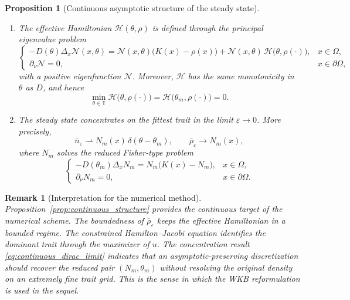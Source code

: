 \documentclass[11pt, dina4, amsfont12]{article}
\newtheorem{proposition}{Proposition}[section]
\newtheorem{remark}{Remark}[section]
\begin{document}
\begin{proposition}[Continuous asymptotic structure of the steady state]
\begin{enumerate}
\item The effective Hamiltonian \(\mathcal H(\theta,\rho)\) is defined through the principal eigenvalue problem
\begin{equation}\label{eq:eigen_N}
\begin{cases}
-D(\theta)\Delta_x \mathcal N(x,\theta)
= \mathcal N(x,\theta)\bigl(K(x)-\rho(x)\bigr)
+ \mathcal N(x,\theta)\,\mathcal H\bigl(\theta,\rho(\cdot)\bigr), & x\in\Omega,\\
\partial_\nu \mathcal N = 0, & x\in\partial\Omega,
\end{cases}
\end{equation}
with a positive eigenfunction \(\mathcal N\). Moreover, \(\mathcal H\) has the same monotonicity in \(\theta\) as \(D\), and hence
\begin{equation}\label{eq:H_min_zero}
\min_{\theta\in\mathbb T} \mathcal H\bigl(\theta,\rho(\cdot)\bigr)
=
\mathcal H\bigl(\theta_m,\rho(\cdot)\bigr)
=0.
\end{equation}

\item The steady state concentrates on the fittest trait in the limit \(\varepsilon\to0\). More precisely,
\begin{equation}\label{eq:continuous_dirac_limit}
\bar n_\varepsilon \rightharpoonup N_m(x)\,\delta(\theta-\theta_m),
\qquad
\bar\rho_\varepsilon \to N_m(x),
\end{equation}
where \(N_m\) solves the reduced Fisher-type problem
\begin{equation}\label{eq:Nm_problem}
\begin{cases}
-D(\theta_m)\Delta_x N_m = N_m\bigl(K(x)-N_m\bigr), & x\in\Omega,\\
\partial_\nu N_m = 0, & x\in\partial\Omega.
\end{cases}
\end{equation}
\end{enumerate}
\end{proposition}

\begin{remark}[Interpretation for the numerical method]\label{rem:AP_target_cont}
Proposition~\ref{prop:continuous_structure} provides the continuous target of the numerical scheme. The boundedness of \(\bar\rho_\varepsilon\) keeps the effective Hamiltonian in a bounded regime. The constrained Hamilton--Jacobi equation identifies the dominant trait through the maximizer of \(u\). The concentration result \eqref{eq:continuous_dirac_limit} indicates that an asymptotic-preserving discretization should recover the reduced pair \((N_m,\theta_m)\) without resolving the original density on an extremely fine trait grid. This is the sense in which the WKB reformulation is used in the sequel.
\end{remark}
\end{document}
